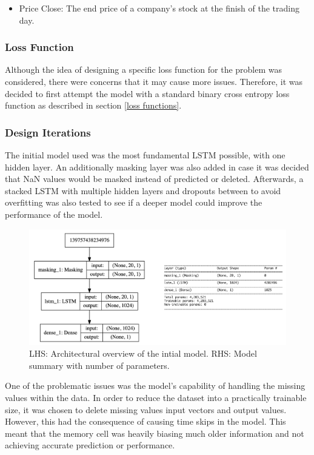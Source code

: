 \documentclass[10pt,onecolumn,letterpaper]{article}
\begin{document}
\begin{itemize}
		\item Price Close: The end price of a company's stock at the finish of the trading day. 
\end{itemize}


\subsubsection{Loss Function}

Although the idea of designing a specific loss function for the problem was considered, there were concerns that it may cause more issues. Therefore, it was decided to first attempt the model with a standard binary cross entropy loss function as described in section \ref{loss functions}.

\subsubsection{Design Iterations} \label{design iterations}

The initial model used was the most fundamental LSTM possible, with one hidden layer. An additionally masking layer was also added in case it was decided that NaN values would be masked instead of predicted or deleted. Afterwards, a stacked LSTM with multiple hidden layers and dropouts between to avoid overfitting was also tested to see if a deeper model could improve the performance of the model. 

\begin{figure}[!hbt!]
\centering
\includegraphics[width=14.5cm]{first_model.png}
\caption{LHS: Architectural overview of the intial model. RHS: Model summary with number of parameters.}
\end{figure}

One of the problematic issues was the model's capability of handling the missing values within the data. In order to reduce the dataset into a practically trainable size, it was chosen to delete missing values input vectors and output values. However, this had the consequence of causing time skips in the model. This meant that the memory cell was heavily biasing much older information and not achieving accurate prediction or performance. 
\end{document}
